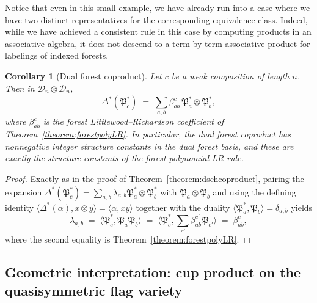 \documentclass[a4paper,fleqn]{cas-sc}
\newtheorem{corollary}[lemma]{Corollary}
\theoremstyle{definition}
\theoremstyle{remark}
\numberwithin{equation}{subsection}
\newcommand{\dcoma}{\mathcal{D}}
\newcommand{\forest}{\mathfrak{P}}
\begin{document}
Notice that even in this small example, we have already run into a case where we have two distinct representatives for the corresponding equivalence class. Indeed, while we have achieved a consistent rule in this case by computing products in an associative algebra, it does not descend to a term-by-term associative product for labelings of indexed forests.


\begin{corollary}[Dual forest coproduct]\label{corollary:dforestcoproduct}
Let $c$ be a weak composition of length $n$. Then in $\dcoma_n\otimes\dcoma_n$,
$$\Delta^*(\forest_c^*) \;=\; \sum_{a,b}\beta_{ab}^c\,\forest_a^*\otimes\forest_b^*,$$
where $\beta_{ab}^c$ is the forest Littlewood--Richardson coefficient of Theorem~\ref{theorem:forestpolyLR}. In particular, the dual forest coproduct has nonnegative integer structure constants in the dual forest basis, and these are exactly the structure constants of the forest polynomial LR rule.
\end{corollary}
\begin{proof}
Exactly as in the proof of Theorem~\ref{theorem:dschcoproduct}, pairing the expansion $\Delta^*(\forest_c^*) = \sum_{a,b}\lambda_{a,b}\forest_a^*\otimes\forest_b^*$ with $\forest_a\otimes\forest_b$ and using the defining identity $\langle\Delta^*(\alpha),x\otimes y\rangle = \langle \alpha, xy\rangle$ together with the duality $\langle \forest_a^*,\forest_b\rangle = \delta_{a,b}$ yields
$$\lambda_{a,b}\;=\;\langle \forest_c^*,\forest_a\forest_b\rangle\;=\;\langle \forest_c^*,\textstyle\sum_{c'}\beta_{ab}^{c'}\forest_{c'}\rangle\;=\;\beta_{ab}^c,$$
where the second equality is Theorem~\ref{theorem:forestpolyLR}.
\end{proof}



\subsection{Geometric interpretation: cup product on the quasisymmetric flag variety}\label{subsection:qflbranch}
\end{document}
